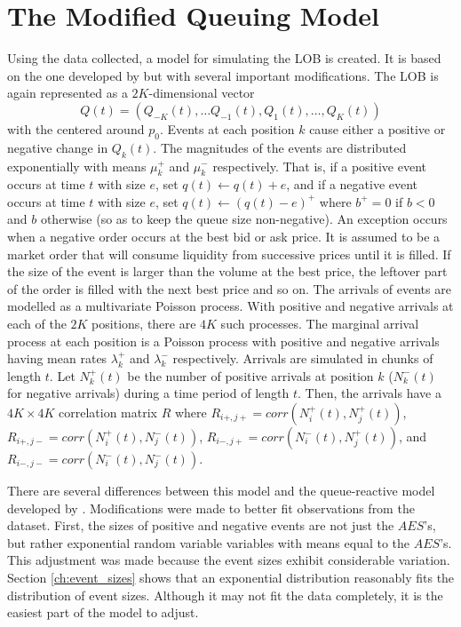 \section{The Modified Queuing Model}\label{ch:queue_model}
Using the data collected, a model for simulating the LOB is created. It is based on the one developed by \cite{A6} but with several important modifications. The LOB is again represented as a $2K$-dimensional vector $$Q(t) = (Q_{-K}(t), \ldots Q_{-1}(t), Q_1(t), \ldots , Q_K(t))$$ with the centered around $p_0$. Events at each position $k$ cause either a positive or negative change in $Q_k(t)$. The magnitudes of the events are distributed exponentially with means $\mu^+_k$ and $\mu^-_k$ respectively. That is, if a positive event occurs at time $t$ with size $e$, set $q(t) \leftarrow q(t) + e$, and if a negative event occurs at time $t$ with size $e$, set $q(t) \leftarrow (q(t) - e)^+$ where $b^+ = 0$ if $b < 0$ and $b$ otherwise (so as to keep the queue size non-negative). An exception occurs when a negative order occurs at the best bid or ask price. It is assumed to be a market order that will consume liquidity from successive prices until it is filled. If the size of the event is larger than the volume at the best price, the leftover part of the order is filled with the next best price and so on. The arrivals of events are modelled as a multivariate Poisson process. With positive and negative arrivals at each of the $2K$ positions, there are $4K$ such processes. The marginal arrival process at each position is a Poisson process with positive and negative arrivals having mean rates $\lambda^+_k$ and $\lambda^-_k$ respectively. Arrivals are simulated in chunks of length $t$. Let $N^+_k(t)$ be the number of positive arrivals at position $k$ ($N^-_k(t)$ for negative arrivals) during a time period of length $t$. Then, the arrivals have a $4K\times4K$ correlation matrix $R$ where $R_{i+,j+} = corr(N^+_i(t), N^+_j(t))$, $R_{i+,j-} = corr(N^+_i(t), N^-_j(t))$, $R_{i-,j+} = corr(N^-_i(t), N^+_j(t))$, and $R_{i-,j-} = corr(N^-_i(t), N^-_j(t))$.

There are several differences between this model and the queue-reactive model developed by \cite{A6}. Modifications were made to better fit observations from the dataset. First, the sizes of positive and negative events are not just the $AES$'s, but rather exponential random variable variables with means equal to the $AES$'s. This adjustment was made because the event sizes exhibit considerable variation. Section \ref{ch:event_sizes} shows that an exponential distribution reasonably fits the distribution of event sizes. Although it may not fit the data completely, it is the easiest part of the model to adjust.

